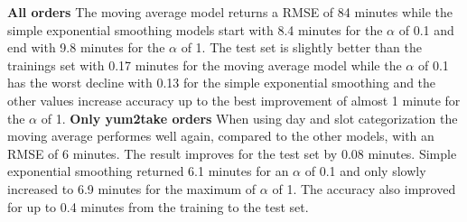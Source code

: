 \newline\newline\textbf{All orders}\newline
The moving average model returns a RMSE of 84 minutes while the simple exponential smoothing models start with 8.4 minutes for the $\alpha$ of 0.1 and end with 9.8 minutes for the $\alpha$ of 1. The test set is slightly better than the trainings set with 0.17 minutes for the moving average model while the $\alpha$ of 0.1 has the worst decline with 0.13 for the simple exponential smoothing and the other values increase accuracy up to the best improvement of almost 1 minute for the $\alpha$ of 1.
\newline\newline\textbf{Only yum2take orders}\newline
When using day and slot categorization the moving average performes well again, compared to the other models, with an RMSE of 6 minutes. The result improves for the test set by 0.08 minutes. Simple exponential smoothing returned 6.1 minutes for an $\alpha$ of 0.1 and only slowly increased to 6.9 minutes for the maximum of $\alpha$ of 1. The accuracy also improved for up to 0.4 minutes from the training to the test set.
